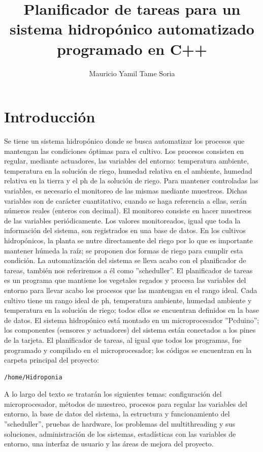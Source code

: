 \documentclass[a4paper,10pt,titlepage]{article}
\title{Planificador de tareas para un sistema hidrop\'onico automatizado programado en C++}
\author{Mauricio Yamil Tame Soria}
\begin{document}
\maketitle
\tableofcontents
\newpage

\section{Introducci\'on}
Se tiene un sistema hidrop\'onico donde se busca automatizar los procesos que mantengan las condiciones \'optimas para el cultivo. Los procesos consisten en regular, 
mediante actuadores, las 
variables del entorno: temperatura ambiente, temperatura en la soluci\'on de riego, humedad relativa en el ambiente, humedad relativa en la tierra y el ph de la soluci\'on 
de riego. Para mantener controladas las variables, es necesario el monitoreo de las mismas mediante muestreos. Dichas variables son de car\'acter 
cuantitativo, cuando se 
haga referencia a ellas, ser\'an n\'umeros 
reales (enteros con decimal). El monitoreo consiste en hacer muestreos de las variables peri\'odicamente. Los valores 
monitoreados, igual que toda la informaci\'on del sistema, son registrados en una base de datos. En los cultivos hidrop\'onicos, la planta se nutre directamente del 
riego por lo que es importante mantener h\'umeda la ra\'iz; se proponen dos formas de riego para cumplir esta condici\'on. La automatizaci\'on del sistema se lleva acabo 
con el planificador de tareas, 
tambi\'en nos referiremos a \'el como ''scheduller''. El planificador de tareas es un programa que mantiene los vegetales regados y procesa las variables del entorno para 
llevar acabo los procesos que 
las mantengan en el rango ideal. Cada cultivo tiene un rango ideal de ph, temperatura ambiente, humedad ambiente y temperatura en la soluci\'on de riego; todos 
ellos se encuentran definidos 
en la 
base de datos. El sistema hidrop\'onico est\'a montado en un microprocesador ''Pcduino''; los componentes (sensores y actuadores) del sistema est\'an 
conectados a los pines de la tarjeta. El planificador de tareas, al igual que todos los programas, fue programado y compilado en el microprocesador; los c\'odigos se 
encuentran en la carpeta principal del proyecto:

\begin{verbatim}
/home/Hidroponia
\end{verbatim}

A lo largo del 
texto se tratar\'an los siguientes temas: configuraci\'on del microprocesador, m\'etodos de muestreo, procesos para regular las variables del entorno, la base de datos 
del sistema, la estructura y 
funcionamiento del 
''scheduller'', pruebas de hardware, los problemas del multithreading y sus soluciones, administraci\'on de los sistemas, estad\'isticas con las variables de entorno, una 
interfaz de usuario y las \'areas de mejora del proyecto.
\end{document}
